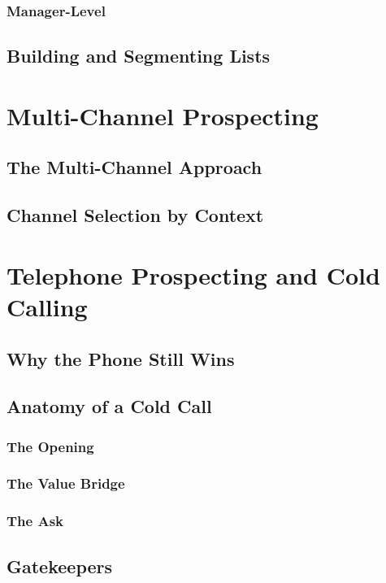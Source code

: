         \subsubsection{Manager-Level}\mbox{}
    \subsection{Building and Segmenting Lists}\mbox{}

\section{Multi-Channel Prospecting}\mbox{}
    \subsection{The Multi-Channel Approach}\mbox{}
    \subsection{Channel Selection by Context}\mbox{}

\section{Telephone Prospecting and Cold Calling}\mbox{}
    \subsection{Why the Phone Still Wins}\mbox{}
    \subsection{Anatomy of a Cold Call}\mbox{}
        \subsubsection{The Opening}\mbox{}
        \subsubsection{The Value Bridge}\mbox{}
        \subsubsection{The Ask}\mbox{}
    \subsection{Gatekeepers}\mbox{}
